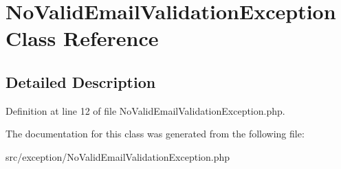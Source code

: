 \hypertarget{classcommon_1_1user_1_1exception_1_1_no_valid_email_validation_exception}{\section{\-No\-Valid\-Email\-Validation\-Exception \-Class \-Reference}
\label{classcommon_1_1user_1_1exception_1_1_no_valid_email_validation_exception}
}


\subsection{\-Detailed \-Description}


\-Definition at line 12 of file \-No\-Valid\-Email\-Validation\-Exception.\-php.



\-The documentation for this class was generated from the following file\-:\begin{DoxyCompactItemize}
\item 
src/exception/\-No\-Valid\-Email\-Validation\-Exception.\-php\end{DoxyCompactItemize}
